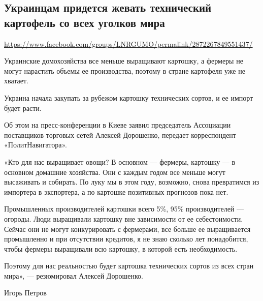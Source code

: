  
 

\subsection{Украинцам придется жевать технический картофель со всех уголков мира}
\url{https://www.facebook.com/groups/LNRGUMO/permalink/2872267849551437/}


Украинские домохозяйства все меньше выращивают картошку, а фермеры не могут
нарастить объемы ее производства, поэтому в стране картофеля уже не хватает.

Украина начала закупать за рубежом картошку технических сортов, и ее импорт
будет расти.

Об этом на пресс-конференции в Киеве заявил председатель Ассоциации поставщиков
торговых сетей Алексей Дорошенко, передает корреспондент «ПолитНавигатора».

«Кто для нас выращивает овощи? В основном --- фермеры, картошку --- в основном
домашние хозяйства. Они с каждым годом все меньше могут высаживать и собирать.
По луку мы в этом году, возможно, снова превратимся из импортера в экспортера,
а по картошке позитивных прогнозов пока нет.

Промышленных производителей картошки всего 5\%, 95\% производителей --- огороды.
Люди выращивали картошку вне зависимости от ее себестоимости. Сейчас они не
могут конкурировать с фермерами, все больше ее выращивается промышленно и при
отсутствии кредитов, я не знаю сколько лет понадобится, чтобы фермеры
выращивали всю картошку, в которой есть необходимость.

Поэтому для нас реальностью будет картошка технических сортов из всех стран
мира», --- резюмировал Алексей Дорошенко.

Игорь Петров
  
